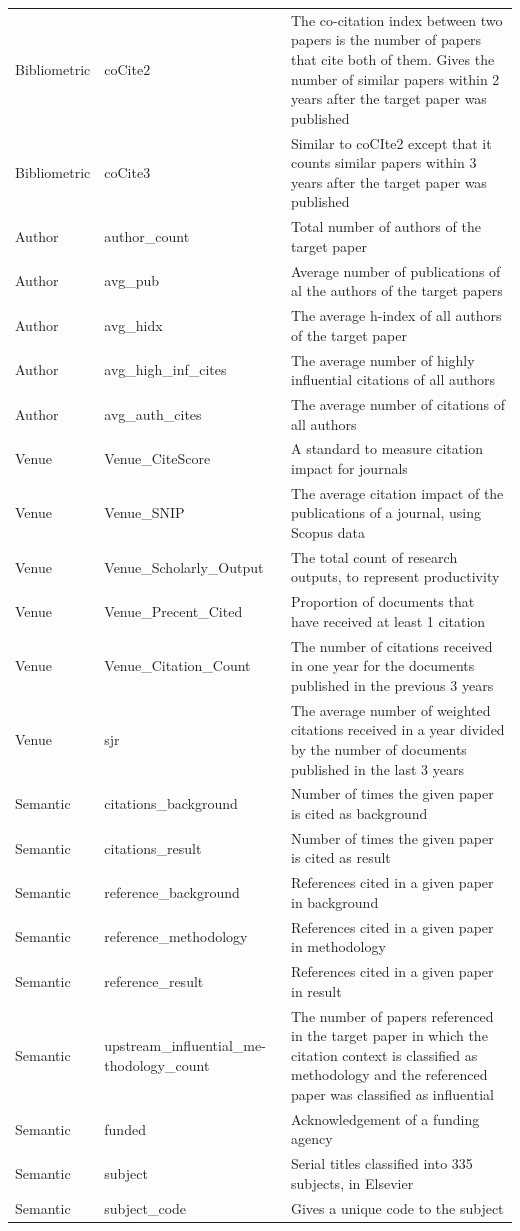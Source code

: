 \documentclass[
10pt, %
a4paper, %
oneside, %
headinclude,footinclude, %
BCOR5mm, %
]{scrartcl}
\begin{document}
\begin{longtable}[c]{|p{2cm}|p{4cm}|p{8cm}|}
Bibliometric & coCite$2$ & The co-citation index between two papers is the number of papers that cite both of them. Gives the number of similar papers within 2 years after the target paper was published\\
Bibliometric & coCite$3$ & Similar to coCIte2 except that it counts similar papers within 3 years after the target paper was published\\
Author & author\_count & Total number of authors of the target paper\\
Author & avg\_pub & Average number of publications of al the authors of the target papers\\
Author & avg\_hidx & The average h-index of all authors of the target paper\\
Author & avg\_high\_inf\_cites & The average number of highly influential citations of all authors\\
Author & avg\_auth\_cites & The average number of citations of all authors\\
Venue & Venue\_CiteScore & A standard to measure citation impact for journals\\
Venue & Venue\_SNIP & The average citation impact of the publications of a journal, using Scopus data\\
Venue & Venue\_Scholarly\_Output & The total count of research outputs, to represent productivity\\
Venue & Venue\_Precent\_Cited & Proportion of documents that have received at least 1 citation\\
Venue & Venue\_Citation\_Count & The number of citations received in one year for the documents published in the previous 3 years\\
Venue & sjr & The average number of weighted citations received in a year divided by the number of documents published in the last 3 years\\
Semantic & citations\_background & Number of times the given paper is cited as background\\
Semantic & citations\_result & Number of times the given paper is cited as result\\
Semantic & reference\_background & References cited in a given paper in background\\
Semantic & reference\_methodology &  References cited in a given paper in methodology\\
Semantic & reference\_result &  References cited in a given paper in result\\
Semantic & upstream\_influential\_me-thodology\_count & The number of papers referenced in the target paper in which the citation context is classified as methodology and the referenced paper was classified as influential \\
Semantic & funded & Acknowledgement of a funding agency\\
Semantic & subject & Serial titles classified into 335 subjects, in Elsevier\\
Semantic & subject\_code & Gives a unique code to the subject\\
 \hline


 \end{longtable}
\end{document}
